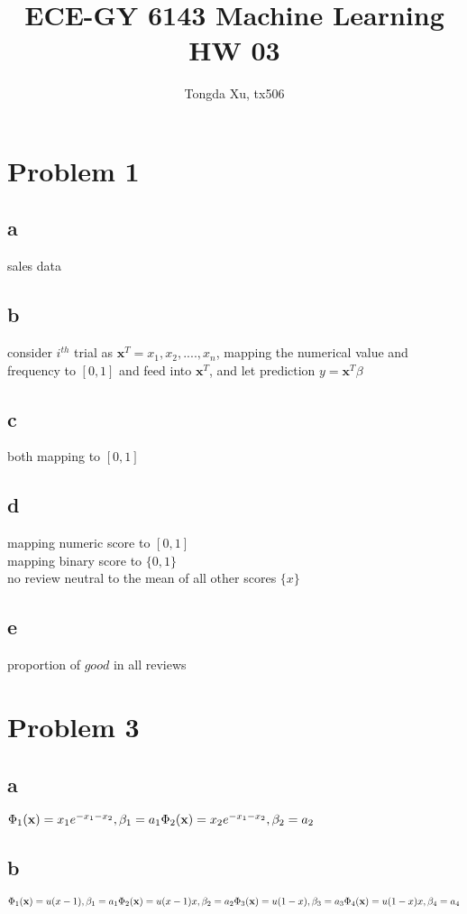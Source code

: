 \documentclass[]{article}
\title{ECE-GY 6143 Machine Learning HW 03}
\author{Tongda Xu, tx506}
\begin{document}
\maketitle
\section{Problem 1}
\subsection{a}
sales data
\subsection{b}
consider $i^{th}$ trial as $\textbf{x}^T = {x_1, x_2, ...., x_n}$, mapping the numerical value and frequency to $[0, 1]$ and feed into $\textbf{x}^T$, and let prediction $y = \textbf{x}^T \beta$
\subsection{c}
both mapping to $[0,1]$
\subsection{d}
mapping numeric score to $[0,1]$\\
mapping binary score to $\{0,1\}$\\
no review neutral to the mean of all other scores $\{x\}$
\subsection{e}
proportion of $good$ in all reviews 

\section{Problem 3}
\subsection{a}
$\Phi_1(\textbf{x}) = x_1e^{-x_1 - x_2}, \beta_1 = a_1\\
\Phi_2(\textbf{x}) = x_2e^{-x_1 - x_2}, \beta_2 = a_2\\
$

\subsection{b}

$
\Phi_1(\textbf{x}) = u(x-1) , \beta_1 = a_1\\
\Phi_2(\textbf{x}) = u(x-1)x ,\beta_2 = a_2  \\
\Phi_3(\textbf{x}) = u(1-x) ,\beta_3 = a_3\\
\Phi_4(\textbf{x}) = u(1-x)x, \beta_4 = a_4\\
$
\end{document}
